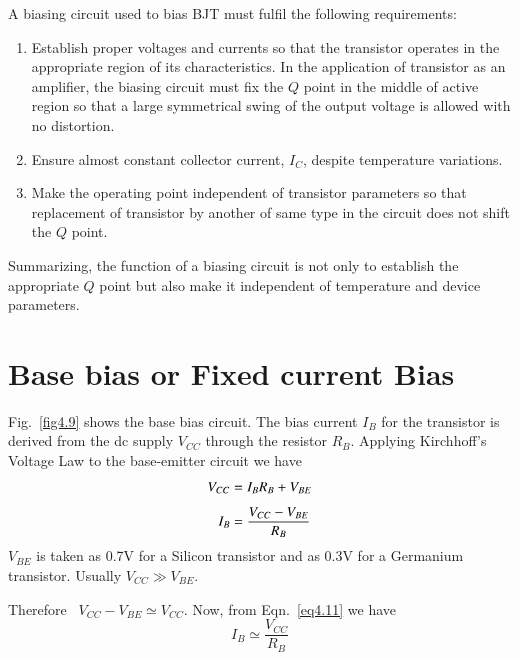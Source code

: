 A biasing circuit used to bias BJT must fulfil the following requirements:
\begin{enumerate}
\item Establish proper voltages and currents so that the transistor operates in the appropriate region of its characteristics. In the application of transistor as an amplifier, the biasing circuit must fix the $Q$ point in the middle of active region so that a large symmetrical swing of the output voltage is allowed with no distortion.

\item Ensure almost constant collector current, $I_{C}$, despite temperature variations.

\item Make the operating point independent of transistor parameters so that replacement of transistor by another of same type in the circuit does not shift the $Q$ point.
\end{enumerate}

Summarizing, the function of a biasing circuit is not only to establish the appropriate $Q$ point but also make it independent of temperature and device parameters.

\section{Base bias or Fixed current Bias}\label{sec4.4}

Fig.~\ref{fig4.9} shows the base bias circuit.
The bias current $I_{B}$ for the transistor is derived from the dc supply $V_{CC}$ through the resistor $R_{B}$. Applying Kirchhoff's Voltage Law to the base-emitter circuit we have
\begin{align}
V_{CC} &= I_{B}R_{B}+V_{BE}\notag\\[4pt]
I_{B} &= \frac{V_{CC}-V_{BE}}{R_{B}}\label{eq4.11} 
\end{align}
$V_{BE}$ is taken as 0.7V for a Silicon transistor and as 0.3V for a Germanium transistor. Usually $V_{CC}\gg V_{BE}$.

\eject

Therefore \ $V_{CC}-V_{BE}\simeq V_{CC}$. Now, from Eqn.~\eqref{eq4.11} we have
\begin{equation}
I_{B}\simeq \frac{V_{CC}}{R_{B}}\label{eq4.12}
\end{equation}


